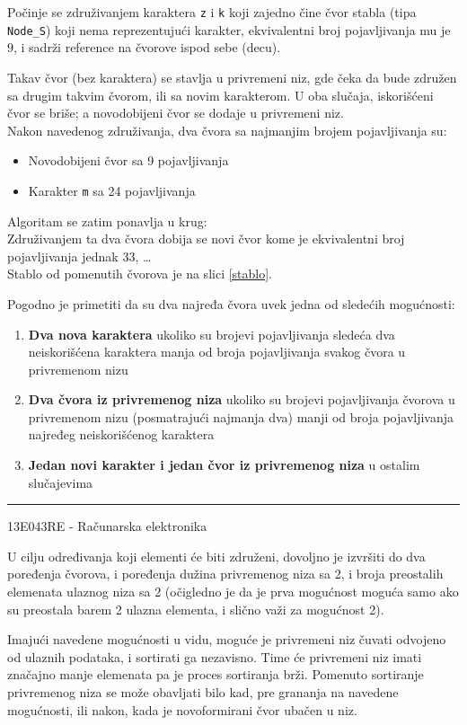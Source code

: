 \documentclass[a4paper, 12pt]{article}
\newcommand{\btmline}{
\vfill
\rule{0.9\textwidth}{0.4mm}
\begin{center}
13E043RE - Računarska elektronika
\end{center}}
\begin{document}
Počinje se združivanjem karaktera \verb|z| i \verb|k| koji zajedno čine čvor stabla (tipa \verb|Node_S|) koji nema reprezentujući karakter, ekvivalentni broj pojavljivanja mu je $9$, i sadrži reference na čvorove ispod sebe (decu). 

Takav čvor (bez karaktera) se stavlja u privremeni niz, gde čeka da bude združen sa drugim takvim čvorom, ili sa novim karakterom. U oba slučaja, iskorišćeni čvor se briše; a novodobijeni čvor se dodaje u privremeni niz. \\
Nakon navedenog združivanja, dva čvora sa najmanjim brojem pojavljivanja su:
\begin{itemize}
	\item Novodobijeni čvor sa 9 pojavljivanja
	\item Karakter \verb|m| sa 24 pojavljivanja
\end{itemize}

Algoritam se zatim ponavlja u krug: \\
Združivanjem ta dva čvora dobija se novi čvor kome je ekvivalentni broj pojavljivanja jednak $33$, \ldots \\
Stablo od pomenutih čvorova je na slici \ref{stablo}.

Pogodno je primetiti da su dva najređa čvora uvek jedna od sledećih mogućnosti:
\begin{enumerate}
	\item \textbf{Dva nova karaktera} ukoliko su brojevi pojavljivanja sledeća dva neiskorišćena karaktera manja od broja pojavljivanja svakog čvora u privremenom nizu
	\item \textbf{Dva čvora iz privremenog niza} ukoliko su brojevi pojavljivanja čvorova u privremenom nizu (posmatrajući najmanja dva) manji od broja pojavljivanja najređeg neiskorišćenog karaktera
	\item \textbf{Jedan novi karakter i jedan čvor iz privremenog niza} u ostalim slučajevima
\end{enumerate}

\btmline\newpage

U cilju određivanja koji elementi će biti združeni, dovoljno je izvršiti do dva poređenja čvorova, i poređenja dužina privremenog niza sa 2, i broja preostalih elemenata ulaznog niza sa 2 (očigledno je da je prva mogućnost moguća samo ako su preostala barem 2 ulazna elementa, i slično važi za mogućnost 2).

Imajući navedene mogućnosti u vidu, moguće je privremeni niz čuvati odvojeno od ulaznih podataka, i sortirati ga nezavisno. Time će privremeni niz imati značajno manje elemenata pa je proces sortiranja brži. Pomenuto sortiranje privremenog niza se može obavljati bilo kad, pre grananja na navedene mogućnosti, ili nakon, kada je novoformirani čvor ubačen u niz.
\end{document}
